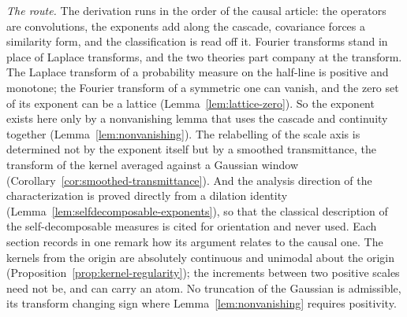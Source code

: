\emph{The route.} The derivation runs in the order of the causal article: the operators
are convolutions, the exponents add along the cascade, covariance forces a similarity form,
and the classification is read off it. Fourier transforms stand in place of Laplace
transforms, and the two theories part company at the transform. The Laplace transform of a
probability measure on the half-line is positive and monotone; the Fourier transform of a
symmetric one can vanish, and the zero set of its exponent can be a lattice
(Lemma~\ref{lem:lattice-zero}). So the exponent exists here only by a nonvanishing lemma
that uses the cascade and continuity together (Lemma~\ref{lem:nonvanishing}). The
relabelling of the scale axis is determined not by the exponent itself but by a smoothed
transmittance, the transform of the kernel averaged against a Gaussian window
(Corollary~\ref{cor:smoothed-transmittance}). And the analysis direction of the
characterization is proved directly from a dilation identity
(Lemma~\ref{lem:selfdecomposable-exponents}), so that the classical description of the
self-decomposable \Levy{} measures is cited for orientation and never used. Each section
records in one remark how its argument relates to the causal one. The kernels from the
origin are absolutely continuous and unimodal about the origin
(Proposition~\ref{prop:kernel-regularity}); the increments between two positive scales need
not be, and can carry an atom. No truncation of the Gaussian is admissible, its transform
changing sign where Lemma~\ref{lem:nonvanishing} requires positivity.

